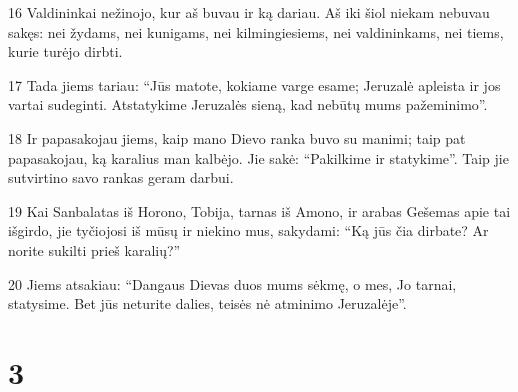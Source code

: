 \par 16 Valdininkai nežinojo, kur aš buvau ir ką dariau. Aš iki šiol niekam nebuvau sakęs: nei žydams, nei kunigams, nei kilmingiesiems, nei valdininkams, nei tiems, kurie turėjo dirbti. 
\par 17 Tada jiems tariau: “Jūs matote, kokiame varge esame; Jeruzalė apleista ir jos vartai sudeginti. Atstatykime Jeruzalės sieną, kad nebūtų mums pažeminimo”. 
\par 18 Ir papasakojau jiems, kaip mano Dievo ranka buvo su manimi; taip pat papasakojau, ką karalius man kalbėjo. Jie sakė: “Pakilkime ir statykime”. Taip jie sutvirtino savo rankas geram darbui. 
\par 19 Kai Sanbalatas iš Horono, Tobija, tarnas iš Amono, ir arabas Gešemas apie tai išgirdo, jie tyčiojosi iš mūsų ir niekino mus, sakydami: “Ką jūs čia dirbate? Ar norite sukilti prieš karalių?” 
\par 20 Jiems atsakiau: “Dangaus Dievas duos mums sėkmę, o mes, Jo tarnai, statysime. Bet jūs neturite dalies, teisės nė atminimo Jeruzalėje”.



\chapter{3}

